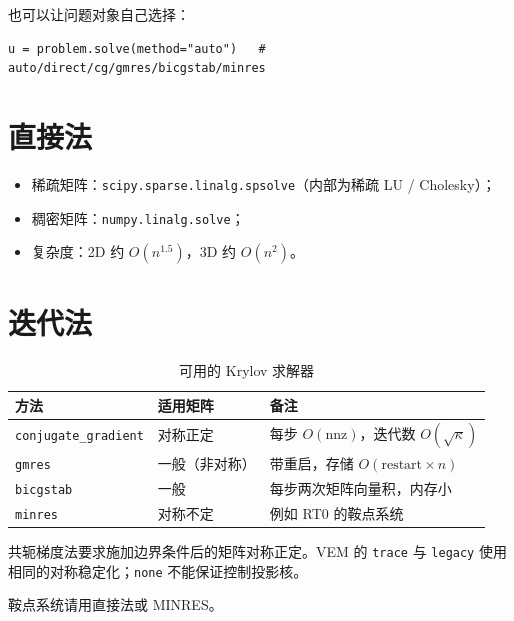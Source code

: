 \documentclass[UTF8,11pt,oneside]{ctexbook}
\theoremstyle{definition}
\theoremstyle{plain}
\newenvironment{caution}{%
  \begin{tcolorbox}[colback=orange!5,colframe=orange!55,title=注意,fonttitle=\bfseries]%
}{%
  \end{tcolorbox}%
}
\newcommand{\code}[1]{\texttt{#1}}
\begin{document}
也可以让问题对象自己选择：

\begin{lstlisting}[language=MosicaFE]
u = problem.solve(method="auto")   # auto/direct/cg/gmres/bicgstab/minres
\end{lstlisting}

\section{直接法}

\begin{itemize}[itemsep=0.2em]
  \item 稀疏矩阵：\code{scipy.sparse.linalg.spsolve}（内部为稀疏 LU / Cholesky）；
  \item 稠密矩阵：\code{numpy.linalg.solve}；
  \item 复杂度：2D 约 $O(n^{1.5})$，3D 约 $O(n^{2})$。
\end{itemize}

\section{迭代法}

\begin{table}[htbp]
\centering
\caption{可用的 Krylov 求解器}
\label{tab:krylov}
\begin{lrbox}{\guideTableBox}
\begin{tabular}{@{}llp{6.4cm}@{}}
\toprule
方法 & 适用矩阵 & 备注 \\
\midrule
\code{conjugate\_\allowbreak gradient} & 对称正定 & 每步 $O(\mathrm{nnz})$，迭代数 $O(\sqrt{\kappa})$ \\
\code{gmres} & 一般（非对称） & 带重启，存储 $O(\text{restart}\times n)$ \\
\code{bicgstab} & 一般 & 每步两次矩阵向量积，内存小 \\
\code{minres} & 对称不定 & 例如 RT0 的鞍点系统 \\
\bottomrule
\end{tabular}
\end{lrbox}%
\ifdim\wd\guideTableBox>\linewidth
  \resizebox{\linewidth}{!}{\usebox{\guideTableBox}}%
\else\usebox{\guideTableBox}\fi
\end{table}

\begin{caution}
共轭梯度法要求施加边界条件后的矩阵对称正定。VEM 的 \code{trace} 与
\code{legacy} 使用相同的对称稳定化；\code{none} 不能保证控制投影核。

鞍点系统请用直接法或 MINRES。
\end{caution}
\end{document}
